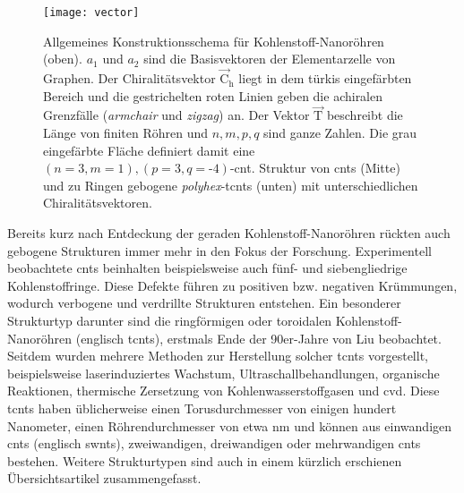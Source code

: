 \begin{figure}[ht!]
	\centering
	\texttt{[image: vector]}
	\captionsetup{figurewithin = chapter}
	\captionsetup{font=small, labelfont=bf}\caption[Allgemeines Konstruktionsschema von (toroidalen \textit{polyhex}-)Kohlenstoff-Nanoröhren]{Allgemeines Konstruktionsschema für Kohlenstoff-Nanoröhren (oben). $a_1$ und $a_2$ sind die Basisvektoren der Elementarzelle von Graphen. Der Chiralitätsvektor $\vec{\text{C}}_\text{h}$ liegt in dem türkis eingefärbten Bereich und die gestrichelten roten Linien geben die achiralen Grenzfälle (\textit{armchair} und \textit{zigzag}) an. Der Vektor $\vec{\text{T}}$ beschreibt die Länge von finiten Röhren und $n,m,p,q$ sind ganze Zahlen. Die grau eingefärbte Fläche definiert damit eine $(n=3,m=1),(p=3,q=\textrm{-}4)$-\ac{cnt}. Struktur von \acp{cnt} (Mitte) und zu Ringen gebogene \textit{polyhex}-\acp{tcnt} (unten) mit unterschiedlichen Chiralitätsvektoren.}
\label{abb:chiralvector}
\end{figure}

Bereits kurz nach Entdeckung der geraden Kohlenstoff-Nanoröhren rückten auch gebogene Strukturen immer mehr in den Fokus der Forschung. Experimentell beobachtete \acp{cnt} beinhalten beispielsweise auch fünf- und siebengliedrige Kohlenstoffringe.\supercite{ichihashi1992pentagons} Diese Defekte führen zu positiven bzw. negativen Krümmungen, wodurch verbogene und verdrillte Strukturen entstehen. Ein besonderer Strukturtyp darunter sind die ringförmigen oder toroidalen Kohlenstoff-Nanoröhren (englisch \acfp{tcnt}), erstmals Ende der 90er-Jahre von Liu\supercite{liu1997c} beobachtet. Seitdem wurden mehrere Methoden zur Herstellung solcher \acp{tcnt} vorgestellt, beispielsweise laserinduziertes Wachstum,\supercite{liu1997c} Ultraschallbehandlungen,\supercite{martel1999rings,martel1999ring} organische Reaktionen,\supercite{sano2001ring,geng2008synthesis} thermische Zersetzung von Kohlenwasserstoffgasen\supercite{ahlskog1999ring} und \ac{cvd}\supercite{song2006large,zhou2006ring}. Diese \acp{tcnt} haben üblicherweise einen Torusdurchmesser von einigen hundert Nanometer, einen Röhrendurchmesser von etwa \unit[5--20]{nm} und können aus einwandigen \acp{cnt} (englisch \acp{swnt}),\supercite{martel1999rings,martel1999ring,sano2001ring,geng2008synthesis,komatsu2006ultrasonic,guo2007spontaneously} zweiwandigen,\supercite{colomer2003rings} dreiwandigen\supercite{yu2006rings} oder mehrwandigen\supercite{ahlskog1999ring} \acp{cnt} bestehen. Weitere Strukturtypen sind auch in einem kürzlich erschienen Übersichtsartikel\supercite{liu2014curved} zusammengefasst.

